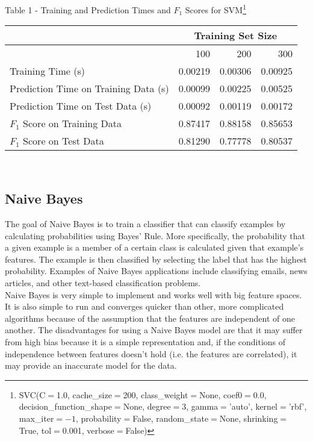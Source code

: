 \documentclass[11pt]{article}
\begin{document}
\begin{center} Table 1 - Training and Prediction Times and $F_1$ Scores for SVM\footnote{SVC(C$=$1.0, cache\_size$=$200, class\_weight$=$None, coef0$=$0.0, decision\_function\_shape$=$None, degree$=$3, gamma$=$'auto', kernel$=$'rbf',
  max\_iter$=-1$, probability$=$False, random\_state$=$None, shrinking$=$True,
  tol$=$0.001, verbose$=$False)}
\end{center}
\begin{tabular}{ l r r r }
  & \multicolumn{3}{c}{Training Set Size} \\
  \hline
  & 100 & 200 & 300\\
  \hline
  Training Time (s) & 0.00219 & 0.00306 & 0.00925 \\
  Prediction Time on Training Data (s) & 0.00099 & 0.00225 & 0.00525 \\
  Prediction Time on Test Data (s) & 0.00092 & 0.00119 & 0.00172 \\
  $F_1$ Score on Training Data & 0.87417 & 0.88158 & 0.85653\\
  $F_1$ Score on Test Data & 0.81290 & 0.77778 & 0.80537 \\
\end{tabular}
\\

\subsection{Naive Bayes}
The goal of Naive Bayes is to train a classifier that can classify examples by calculating probabilities using Bayes’ Rule. More specifically, the probability that a given example is a member of a certain class is calculated given that example’s features. The example is then classified by selecting the label that has the highest probability. Examples of Naive Bayes applications include classifying emails, news articles, and other text-based classification problems.\\

Naive Bayes is very simple to implement and works well with big feature spaces. It is also simple to run and converges quicker than other, more complicated algorithms because of the assumption that the features are independent of one another. The disadvantages for using a Naive Bayes model are that it may suffer from high bias because it is a simple representation and, if the conditions of independence between features doesn’t hold (i.e. the features are correlated), it may provide an inaccurate model for the data.\\
\end{document}
